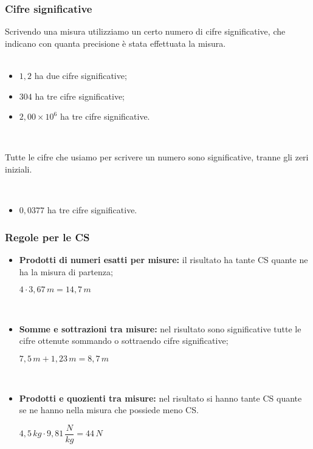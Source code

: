 \documentclass[]{beamer}
\begin{document}
\begin{frame}
\frametitle{Cifre significative}
Scrivendo una misura utilizziamo un certo numero di \alert<1>{cifre significative}, che indicano con quanta precisione è stata effettuata la misura.\\~\pause
\begin{itemize}
  \item $ 1,2 $ ha due cifre significative;\pause
  \item $ 304 $ ha tre cifre significative;\pause
  \item $ 2,00 \times 10^{6} $ ha tre cifre significative.
\end{itemize}
\pause

~

\alert<5>{Tutte le cifre che usiamo per scrivere un numero sono significative, tranne gli zeri iniziali.}

~

\begin{itemize}
  \item $ 0,0377 $ ha tre cifre significative.
\end{itemize}
\end{frame}



\begin{frame}
\frametitle{Regole per le CS}
\begin{itemize}
  \item \textbf{Prodotti di numeri esatti per misure:} il risultato ha tante CS quante ne ha la misura di partenza;
\begin{center}
    $ 4 \cdot 3,67 \, m = 14,7 \, m $
  \end{center}~\pause
  \item \textbf{Somme e sottrazioni tra misure:} nel risultato sono significative tutte le cifre ottenute sommando o sottraendo cifre significative;
  \begin{center}
  $ 7,5 \, m + 1,23 \, m = 8,7 \, m $
  \end{center}~\pause
  \item \textbf{Prodotti e quozienti tra misure:} nel risultato si hanno tante CS quante se ne hanno nella misura che possiede meno CS.
  \begin{center}
  $ 4,5 \, kg \cdot 9,81 \, \dfrac{N}{kg} = 44 \, N $
  \end{center}
\end{itemize}
\end{frame}
\end{document}
